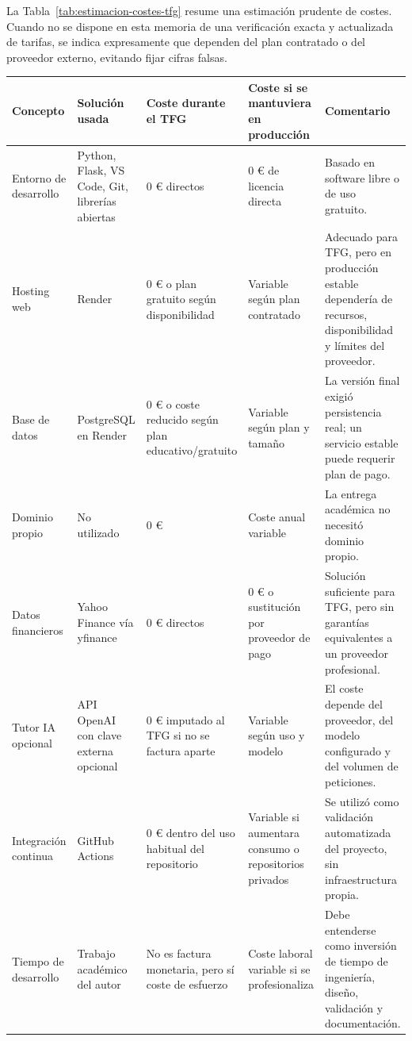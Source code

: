 La Tabla~\ref{tab:estimacion-costes-tfg} resume una estimación prudente de costes. Cuando no se dispone en esta memoria de una verificación exacta y actualizada de tarifas, se indica expresamente que dependen del plan contratado o del proveedor externo, evitando fijar cifras falsas.

\begin{table}[htbp]
\centering
\small
\renewcommand{\arraystretch}{1.15}
\begin{tabular}{|p{}|p{}|p{}|p{}|p{}|}
\hline
\textbf{Concepto} & \textbf{Solución usada} & \textbf{Coste durante el TFG} & \textbf{Coste si se mantuviera en producción} & \textbf{Comentario} \\ \hline
Entorno de desarrollo & Python, Flask, VS Code, Git, librerías abiertas & 0 € directos & 0 € de licencia directa & Basado en software libre o de uso gratuito. \\ \hline
Hosting web & Render & 0 € o plan gratuito según disponibilidad \cite{render} & Variable según plan contratado & Adecuado para TFG, pero en producción estable dependería de recursos, disponibilidad y límites del proveedor. \\ \hline
Base de datos & PostgreSQL en Render & 0 € o coste reducido según plan educativo/gratuito & Variable según plan y tamaño & La versión final exigió persistencia real; un servicio estable puede requerir plan de pago. \\ \hline
Dominio propio & No utilizado & 0 € & Coste anual variable & La entrega académica no necesitó dominio propio. \\ \hline
Datos financieros & Yahoo Finance vía yfinance & 0 € directos & 0 € o sustitución por proveedor de pago & Solución suficiente para TFG, pero sin garantías equivalentes a un proveedor profesional. \\ \hline
Tutor IA opcional & API OpenAI con clave externa opcional & 0 € imputado al TFG si no se factura aparte & Variable según uso y modelo & El coste depende del proveedor, del modelo configurado y del volumen de peticiones. \\ \hline
Integración continua & GitHub Actions & 0 € dentro del uso habitual del repositorio \cite{github_actions} & Variable si aumentara consumo o repositorios privados & Se utilizó como validación automatizada del proyecto, sin infraestructura propia. \\ \hline
Tiempo de desarrollo & Trabajo académico del autor & No es factura monetaria, pero sí coste de esfuerzo & Coste laboral variable si se profesionaliza & Debe entenderse como inversión de tiempo de ingeniería, diseño, validación y documentación. \\ \hline

\end{tabular}
\end{table}
